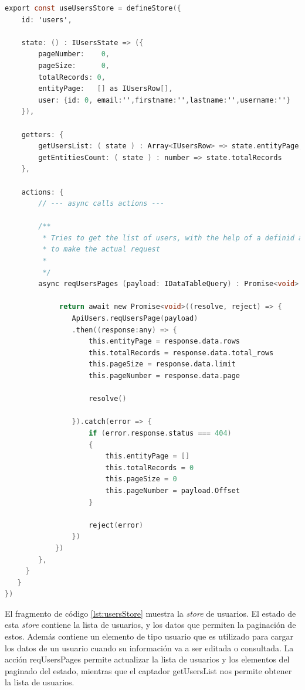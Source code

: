 \begin{lstlisting}[language=C,caption={Store de usuarios}, label={lst:usersStore}]
export const useUsersStore = defineStore({
    id: 'users',

    state: () : IUsersState => ({
        pageNumber:    0,
        pageSize:      0,
        totalRecords: 0,
        entityPage:   [] as IUsersRow[],
        user: {id: 0, email:'',firstname:'',lastname:'',username:''} 
    }),

    getters: {
        getUsersList: ( state ) : Array<IUsersRow> => state.entityPage,
        getEntitiesCount: ( state ) : number => state.totalRecords
    },

    actions: {
        // --- async calls actions ---

        /**
         * Tries to get the list of users, with the help of a definid axios apis
         * to make the actual request
         *
         */
        async reqUsersPages (payload: IDataTableQuery) : Promise<void> {

             return await new Promise<void>((resolve, reject) => {
                ApiUsers.reqUsersPage(payload)
                .then((response:any) => {
                    this.entityPage = response.data.rows                  
                    this.totalRecords = response.data.total_rows
                    this.pageSize = response.data.limit
                    this.pageNumber = response.data.page
                    
                    resolve()

                }).catch(error => {
                    if (error.response.status === 404)
                    {
                        this.entityPage = []
                        this.totalRecords = 0
                        this.pageSize = 0
                        this.pageNumber = payload.Offset
                    }

                    reject(error)
                })
            })
        },
     }
   }
})
\end{lstlisting}

El fragmento de código \ref{lst:usersStore} muestra la \textit{store} de usuarios. El estado de esta \textit{store} contiene la lista de usuarios, y los datos que permiten la paginación de estos. Además contiene un elemento de tipo usuario que es utilizado para cargar los datos de un usuario cuando su información va a ser editada o consultada. La acción reqUsersPages permite actualizar la lista de usuarios y los elementos del paginado del estado, mientras que el captador getUsersList nos permite obtener la lista de usuarios.


